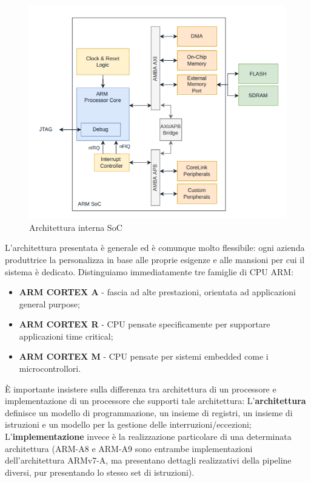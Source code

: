 \begin{figure}[ht!]
    \centering
    \includegraphics[width=.75\textwidth]{img/arm_internals.png}
    \caption{Architettura interna SoC}
    \label{img:ARM_internals}
\end{figure}

L'architettura presentata è generale ed è comunque molto flessibile: ogni azienda produttrice la personalizza in base alle proprie esigenze e alle mansioni per cui il sistema è dedicato.
Distinguiamo immediatamente tre famiglie di CPU ARM:
\begin{itemize}
    \item \textbf{ARM CORTEX A} - fascia ad alte prestazioni, orientata ad applicazioni general purpose;
    \item \textbf{ARM CORTEX R} - CPU pensate specificamente per supportare applicazioni time critical;
    \item \textbf{ARM CORTEX M} - CPU pensate per sistemi embedded come i microcontrollori.
\end{itemize} 

\uppercase{è} importante insistere sulla differenza tra architettura di un processore e implementazione di un processore che supporti tale architettura: L'\textbf{architettura} definisce un modello di programmazione, un insieme di registri, un insieme di istruzioni e un modello per la gestione delle interruzioni/eccezioni; L'\textbf{implementazione} invece è la realizzazione particolare di una determinata architettura (ARM-A8 e ARM-A9 sono entrambe implementazioni dell'architettura ARMv7-A, ma presentano dettagli realizzativi della pipeline diversi, pur presentando lo stesso set di istruzioni).

